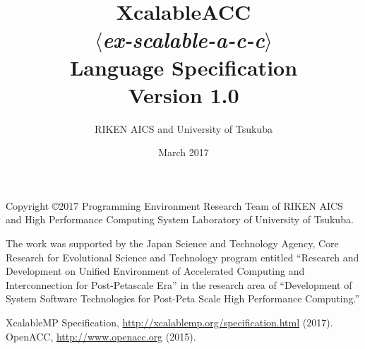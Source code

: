 \documentclass[a4paper,11pt,twoside]{report}
\title{{\Huge XcalableACC}\\
$\langle${\it ex-scalable-a-c-c}$\rangle$\\
Language Specification\\
\vspace{2cm}
Version 1.0\\}
\author{
\Large RIKEN AICS and University of Tsukuba\\
}
\date{\vspace{4cm}\Large March 2017}
\def\XMP{XcalableMP}
\begin{document}
\maketitle

Copyright \copyright 2017 Programming Environment Research Team of RIKEN AICS
and High Performance Computing System Laboratory of University of Tsukuba.

\clearpage

\cleardoublepage

\tableofcontents

\newpage
\mbox{}\newpage

\pagestyle{fancy}
\fancyhead{} %
\fancyhead[RE]{\leftmark}
\fancyhead[LO]{\rightmark}
\fancyhead[LE,RO]{\thepage}
\fancyfoot{} %
\renewcommand{\headrulewidth}{0pt}
\renewcommand{\footrulewidth}{0pt}

 \cleardoublepage
 \cleardoublepage
 \cleardoublepage
%

The work was supported by the Japan Science and Technology Agency, 
Core Research for Evolutional Science and Technology program entitled 
``Research and Development on Unified Environment of Accelerated Computing and Interconnection for Post-Petascale Era'' 
in the research area of ``Development of System Software Technologies for Post-Peta Scale High Performance Computing.''


\begin{thebibliography}{99}
  XcalableMP Specification, \url{http://xcalablemp.org/specification.html} (2017).
  OpenACC, \url{http://www.openacc.org} (2015).
\end{thebibliography}
\end{document}
